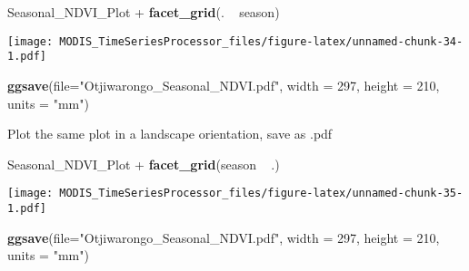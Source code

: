 \documentclass[]{article}
\newenvironment{Shaded}{\begin{snugshade}}{\end{snugshade}}
\newcommand{\KeywordTok}[1]{\textcolor[rgb]{0.13,0.29,0.53}{\textbf{{#1}}}}
\newcommand{\DataTypeTok}[1]{\textcolor[rgb]{0.13,0.29,0.53}{{#1}}}
\newcommand{\DecValTok}[1]{\textcolor[rgb]{0.00,0.00,0.81}{{#1}}}
\newcommand{\StringTok}[1]{\textcolor[rgb]{0.31,0.60,0.02}{{#1}}}
\newcommand{\NormalTok}[1]{{#1}}
\begin{document}
\begin{Shaded}
\begin{Highlighting}[]
\NormalTok{Seasonal_NDVI_Plot +}\StringTok{ }\KeywordTok{facet_grid}\NormalTok{(. ~}\StringTok{ }\NormalTok{season)}
\end{Highlighting}
\end{Shaded}

\texttt{[image: MODIS\_TimeSeriesProcessor\_files/figure-latex/unnamed-chunk-34-1.pdf]}

\begin{Shaded}
\begin{Highlighting}[]
\KeywordTok{ggsave}\NormalTok{(}\DataTypeTok{file=}\StringTok{"Otjiwarongo_Seasonal_NDVI.pdf"}\NormalTok{, }\DataTypeTok{width =} \DecValTok{297}\NormalTok{, }\DataTypeTok{height =} \DecValTok{210}\NormalTok{, }\DataTypeTok{units =} 
         \StringTok{"mm"}\NormalTok{)}
\end{Highlighting}
\end{Shaded}

Plot the same plot in a landscape orientation, save as .pdf

\begin{Shaded}
\begin{Highlighting}[]
\NormalTok{Seasonal_NDVI_Plot +}\StringTok{ }\KeywordTok{facet_grid}\NormalTok{(season ~}\StringTok{ }\NormalTok{.)}
\end{Highlighting}
\end{Shaded}

\texttt{[image: MODIS\_TimeSeriesProcessor\_files/figure-latex/unnamed-chunk-35-1.pdf]}

\begin{Shaded}
\begin{Highlighting}[]
\KeywordTok{ggsave}\NormalTok{(}\DataTypeTok{file=}\StringTok{"Otjiwarongo_Seasonal_NDVI.pdf"}\NormalTok{, }\DataTypeTok{width =} \DecValTok{297}\NormalTok{, }\DataTypeTok{height =} \DecValTok{210}\NormalTok{, }\DataTypeTok{units =} 
         \StringTok{"mm"}\NormalTok{)}
\end{Highlighting}
\end{Shaded}
\end{document}
